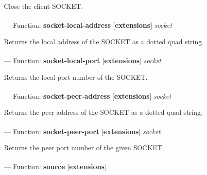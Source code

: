 \begin{adjustwidth}{5em}{5em}
Close the client SOCKET.
\end{adjustwidth}

\paragraph{}
\label{EXTENSIONS:SOCKET-LOCAL-ADDRESS}
--- Function: \textbf{socket-local-address} [\textbf{extensions}] \textit{socket}

\begin{adjustwidth}{5em}{5em}
Returns the local address of the SOCKET as a dotted quad string.
\end{adjustwidth}

\paragraph{}
\label{EXTENSIONS:SOCKET-LOCAL-PORT}
--- Function: \textbf{socket-local-port} [\textbf{extensions}] \textit{socket}

\begin{adjustwidth}{5em}{5em}
Returns the local port number of the SOCKET.
\end{adjustwidth}

\paragraph{}
\label{EXTENSIONS:SOCKET-PEER-ADDRESS}
--- Function: \textbf{socket-peer-address} [\textbf{extensions}] \textit{socket}

\begin{adjustwidth}{5em}{5em}
Returns the peer address of the SOCKET as a dotted quad string.
\end{adjustwidth}

\paragraph{}
\label{EXTENSIONS:SOCKET-PEER-PORT}
--- Function: \textbf{socket-peer-port} [\textbf{extensions}] \textit{socket}

\begin{adjustwidth}{5em}{5em}
Returns the peer port number of the given SOCKET.
\end{adjustwidth}

\paragraph{}
\label{EXTENSIONS:SOURCE}
--- Function: \textbf{source} [\textbf{extensions}] \textit{}

